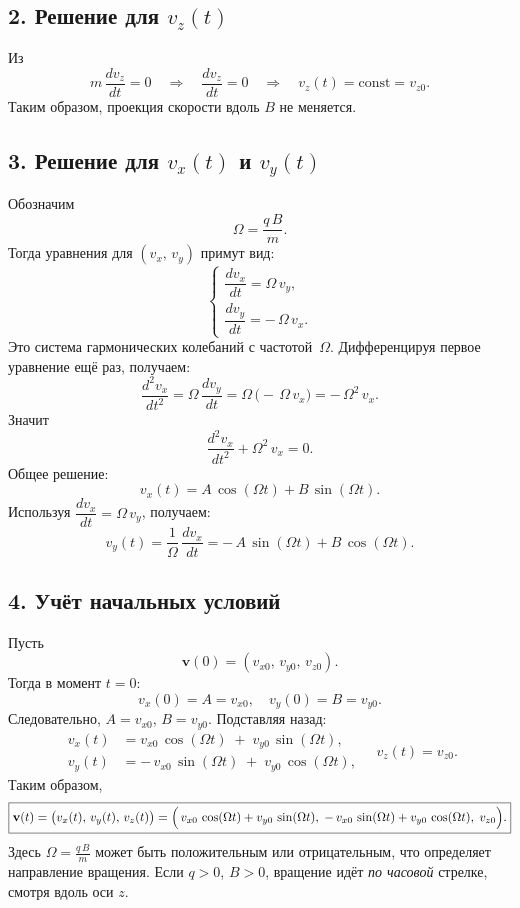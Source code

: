\documentclass{article}
\begin{document}
\subsection*{2. Решение для \texorpdfstring{$v_z(t)$}{vz(t)}}

Из
\[
m \,\frac{dv_z}{dt} = 0
\quad\Longrightarrow\quad
\frac{dv_z}{dt} = 0
\quad\Longrightarrow\quad
v_z(t)= \mathrm{const} = v_{z0}.
\]
Таким образом, проекция скорости вдоль $B$ не меняется.

\subsection*{3. Решение для \texorpdfstring{$v_x(t)$}{vx(t)} и $v_y(t)$}

Обозначим
\[
\Omega = \frac{q\,B}{m}.
\]
Тогда уравнения для $(v_x,\,v_y)$ примут вид:
\[
\begin{cases}
\dfrac{dv_x}{dt} = \Omega\,v_y,\\
\dfrac{dv_y}{dt} = -\,\Omega\,v_x.
\end{cases}
\]
Это система гармонических колебаний с частотой~$\Omega$. Дифференцируя первое уравнение ещё раз, получаем:
\[
\frac{d^2 v_x}{dt^2}
=
\Omega\,\frac{dv_y}{dt}
=
\Omega \,\bigl(-\,\Omega\,v_x\bigr)
=
-\,\Omega^2 \,v_x.
\]
Значит
\[
\frac{d^2 v_x}{dt^2} + \Omega^2\,v_x = 0.
\]
Общее решение:
\[
v_x(t)
=
A\,\cos(\Omega t) + B\,\sin(\Omega t).
\]
Используя
\(\dfrac{dv_x}{dt} = \Omega\,v_y\),
получаем:
\[
v_y(t)
=
\frac{1}{\Omega}\,\frac{dv_x}{dt}
=
-\,A\,\sin(\Omega t) + B\,\cos(\Omega t).
\]

\subsection*{4. Учёт начальных условий}

Пусть
\[
\mathbf{v}(0) = (v_{x0},\,v_{y0},\,v_{z0}).
\]
Тогда в момент $t=0$:
\[
v_x(0)
=
A
=
v_{x0},
\quad
v_y(0)
=
B
=
v_{y0}.
\]
Следовательно, $A=v_{x0}$, $B=v_{y0}$. Подставляя назад:
\[
\begin{aligned}
v_x(t)
&=
v_{x0}\,\cos(\Omega t) \;+\; v_{y0}\,\sin(\Omega t),\\
v_y(t)
&=
-\,v_{x0}\,\sin(\Omega t) \;+\; v_{y0}\,\cos(\Omega t),
\end{aligned}
\quad
v_z(t)
=
v_{z0}.
\]
Таким образом,
\[
\boxed{
\mathbf{v}(t)
=
\bigl(v_x(t),\,v_y(t),\,v_z(t)\bigr)
=
\Bigl(\,
v_{x0}\,\cos(\Omega t) + v_{y0}\,\sin(\Omega t),\;
-\,v_{x0}\,\sin(\Omega t) + v_{y0}\,\cos(\Omega t),\;
v_{z0}
\Bigr).
}
\]
Здесь
\(\Omega = \tfrac{q\,B}{m}\)
может быть положительным или отрицательным, что определяет направление вращения. Если $q>0$, $B>0$, вращение идёт \emph{по часовой} стрелке, смотря вдоль оси $z$.
\end{document}
